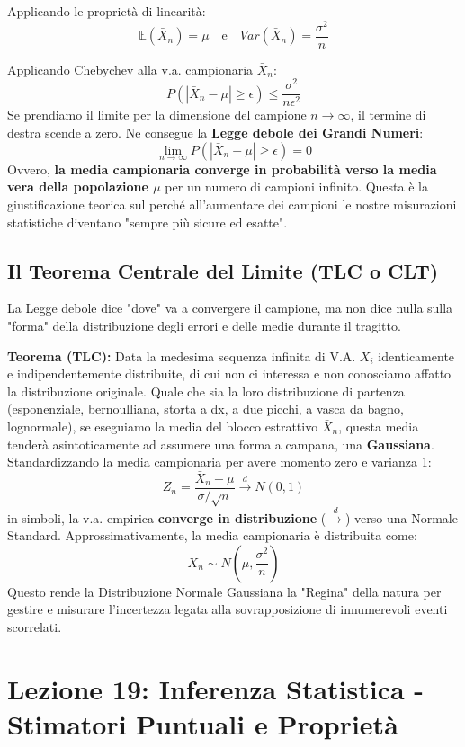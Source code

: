 \documentclass[12pt, a4paper]{article}
\begin{document}
Applicando le proprietà di linearità:
$$ \mathbb{E}(\bar{X}_n) = \mu \quad \text{e} \quad Var(\bar{X}_n) = \frac{\sigma^2}{n} $$

Applicando Chebychev alla v.a. campionaria $\bar{X}_n$:
$$ P(|\bar{X}_n - \mu| \ge \epsilon) \le \frac{\sigma^2}{n \epsilon^2} $$
Se prendiamo il limite per la dimensione del campione $n \to \infty$, il termine di destra scende a zero.
Ne consegue la \textbf{Legge debole dei Grandi Numeri}:
$$ \lim_{n \to \infty} P(|\bar{X}_n - \mu| \ge \epsilon) = 0 $$
Ovvero, \textbf{la media campionaria converge in probabilità verso la media vera della popolazione $\mu$} per un numero di campioni infinito. Questa è la giustificazione teorica sul perché all'aumentare dei campioni le nostre misurazioni statistiche diventano "sempre più sicure ed esatte".

\subsection{Il Teorema Centrale del Limite (TLC o CLT)}
La Legge debole dice "dove" va a convergere il campione, ma non dice nulla sulla "forma" della distribuzione degli errori e delle medie durante il tragitto.

\textbf{Teorema (TLC):} Data la medesima sequenza infinita di V.A. $X_i$ identicamente e indipendentemente distribuite, di cui non ci interessa e non conosciamo affatto la distribuzione originale. Quale che sia la loro distribuzione di partenza (esponenziale, bernoulliana, storta a dx, a due picchi, a vasca da bagno, lognormale), se eseguiamo la media del blocco estrattivo $\bar{X}_n$, questa media tenderà asintoticamente ad assumere una forma a campana, una \textbf{Gaussiana}.
Standardizzando la media campionaria per avere momento zero e varianza 1:
$$ Z_n = \frac{\bar{X}_n - \mu}{\sigma/\sqrt{n}} \xrightarrow{d} N(0,1) $$
in simboli, la v.a. empirica \textbf{converge in distribuzione} ($\xrightarrow{d}$) verso una Normale Standard. 
Approssimativamente, la media campionaria è distribuita come:
$$ \bar{X}_n \sim N\left(\mu, \frac{\sigma^2}{n}\right) $$
Questo rende la Distribuzione Normale Gaussiana la "Regina" della natura per gestire e misurare l'incertezza legata alla sovrapposizione di innumerevoli eventi scorrelati.


\newpage

\section{Lezione 19: Inferenza Statistica - Stimatori Puntuali e Proprietà}
\end{document}
